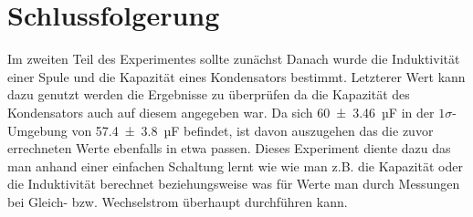 
\section{Schlussfolgerung}







Im zweiten Teil des Experimentes sollte zunächst %
Danach wurde die Induktivität einer Spule und die Kapazität eines Kondensators bestimmt.
Letzterer Wert kann dazu genutzt werden die Ergebnisse zu überprüfen da die Kapazität des Kondensators auch auf diesem angegeben war.
Da sich \SI{60+-3.46}{µF} in der $1\sigma$-Umgebung von \SI{57.4+-3.8}{µF} befindet, ist davon auszugehen das die zuvor errechneten Werte ebenfalls in etwa passen.
Dieses Experiment diente dazu das man anhand einer einfachen Schaltung lernt wie wie man z.B. die Kapazität oder die Induktivität berechnet beziehungsweise was für Werte man durch Messungen bei Gleich- bzw. Wechselstrom überhaupt durchführen kann.










